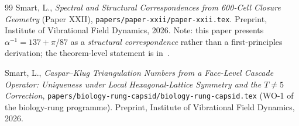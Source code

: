 \documentclass[12pt]{article}
\begin{document}
\begin{thebibliography}{99}
Smart, L.,
\emph{Spectral and Structural Correspondences from 600-Cell
Closure Geometry} (Paper XXII),
\texttt{papers/paper-xxii/paper-xxii.tex}.
Preprint, Institute of Vibrational Field Dynamics, 2026.
Note: this paper presents $\alpha^{-1} = 137 + \pi/87$ as a
\emph{structural correspondence} rather than a first-principles
derivation; the theorem-level statement is in~\cite{CascadeAlphaChain}.

Smart, L.,
\emph{Caspar--Klug Triangulation Numbers from a Face-Level Cascade
Operator: Uniqueness under Local Hexagonal-Lattice Symmetry and the
$T \neq 5$ Correction},
\texttt{papers/biology-rung-capsid/biology-rung-capsid.tex} (WO-1
of the biology-rung programme). Preprint, Institute of Vibrational
Field Dynamics, 2026.

\end{thebibliography}
\end{document}
